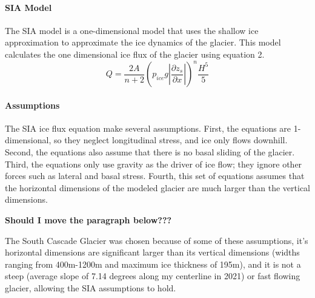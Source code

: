 \documentclass{article}
\begin{document}
\paragraph{SIA Model}

The SIA model is a one-dimensional model that uses the shallow ice approximation to approximate the ice dynamics of the glacier. This model 
calculates the one dimensional ice flux of the glacier using equation 2. 
\begin{equation}Q=\frac{2A}{n+2}(p_{ice}g|\frac{\partial z_s}{\partial x}|)^n\frac{H^5}{5}\end{equation}
\paragraph{Assumptions}

The SIA ice flux equation make several assumptions. First, the equations are 1-dimensional, so they neglect longitudinal stress, and ice only 
flows downhill. Second, the equations also assume that there is no basal sliding of the glacier. Third, the equations only use gravity as the 
driver of ice flow; they ignore other forces such as lateral and basal stress. Fourth, this set of equations assumes that the horizontal 
dimensions of the modeled glacier are much larger than the vertical dimensions.

\textbf{Should I move the paragraph below???}

The South Cascade Glacier was chosen because of some of these assumptions, it's horizontal dimensions are significant larger than its vertical 
dimensions (widths ranging from 400m-1200m and maximum ice thickness of 195m), and it is not a steep (average slope of 7.14 degrees along my 
centerline in 2021) or fast flowing glacier, allowing the SIA assumptions to hold.
\end{document}
